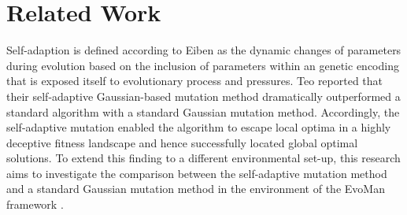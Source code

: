 \section{Related Work}

Self-adaption is defined according to Eiben \cite{series/ncs/EibenS03} as the dynamic changes of parameters during evolution based on the inclusion of parameters within an genetic encoding that is exposed itself to evolutionary process and pressures. Teo \cite{Teo2006SelfadaptiveMF} reported that their self-adaptive Gaussian-based mutation method dramatically outperformed a standard algorithm with a standard Gaussian mutation method. Accordingly, the self-adaptive mutation enabled the algorithm to escape local optima in a highly deceptive fitness landscape and hence successfully located global optimal solutions. To extend this finding to a different environmental set-up, this research aims to investigate the comparison between the self-adaptive mutation method and a standard Gaussian mutation method in the environment of the EvoMan framework \cite{Arajo2016EvolvingAG}.



